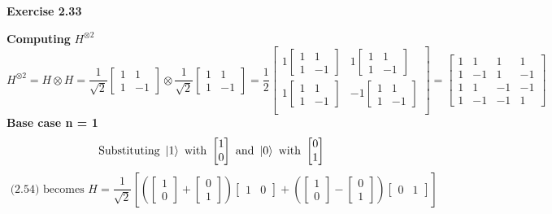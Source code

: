 \documentclass{article}
\begin{document}
\begin{framed}
    \noindent \textbf{Exercise 2.33}
    
    \medskip

    \textbf{Computing} $H^{\otimes 2}$
    $$
    H^{\otimes 2} = H \otimes H = \frac{1}{\sqrt{2}}\begin{bmatrix}1 & 1 \\ 1 & -1\end{bmatrix} \otimes \frac{1}{\sqrt{2}}\begin{bmatrix}1 & 1 \\ 1 & -1\end{bmatrix} = \frac{1}{2}
    \begin{bmatrix}
    1 \begin{bmatrix}1 & 1 \\ 1 & -1\end{bmatrix} &
    1 \begin{bmatrix}1 & 1 \\ 1 & -1\end{bmatrix} \\
    1 \begin{bmatrix}1 & 1 \\ 1 & -1\end{bmatrix} & 
    -1 \begin{bmatrix}1 & 1 \\ 1 & -1\end{bmatrix} \\
    \end{bmatrix} =
    \begin{bmatrix}
        1 & 1 & 1 & 1 \\
        1 & -1 & 1 & -1 \\
        1 & 1 & -1 & -1 \\
        1 & -1 & -1 & 1
    \end{bmatrix}
    $$
    \textbf{Base case n = 1}
    $$
    \text{Substituting } \ket{1} \text{ with } \begin{bmatrix}1 \\ 0\end{bmatrix} \text{ and } \ket{0} \text{ with } \begin{bmatrix}0 \\ 1\end{bmatrix} $$
    $$\text{ (2.54) becomes } H = \frac{1}{\sqrt{2}}[(\begin{bmatrix}1 \\ 0\end{bmatrix} + \begin{bmatrix}0 \\ 1\end{bmatrix})\begin{bmatrix}1 & 0\end{bmatrix} + (\begin{bmatrix}1 \\ 0\end{bmatrix} - \begin{bmatrix}0 \\ 1\end{bmatrix})\begin{bmatrix}0 & 1\end{bmatrix}]
$$
\end{framed}
\end{document}
